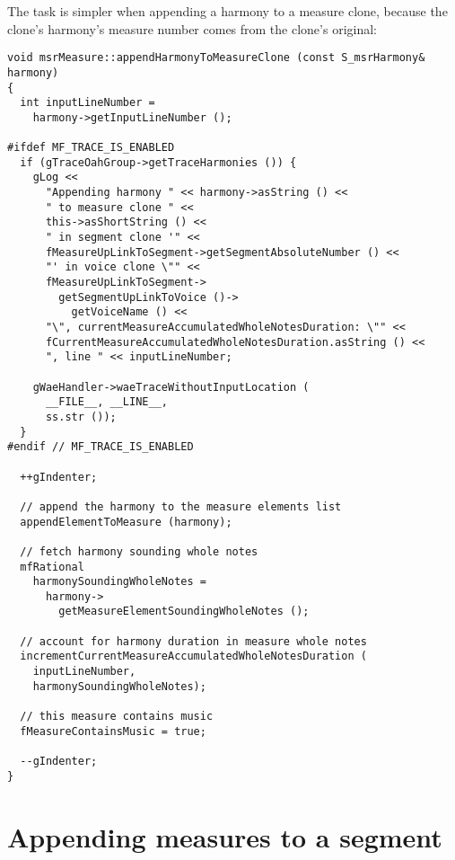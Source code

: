 The task is simpler when appending a harmony to a measure clone, because the clone's harmony's measure number comes from the clone's original:
\begin{lstlisting}[language=CPlusPlus]
void msrMeasure::appendHarmonyToMeasureClone (const S_msrHarmony& harmony)
{
  int inputLineNumber =
    harmony->getInputLineNumber ();

#ifdef MF_TRACE_IS_ENABLED
  if (gTraceOahGroup->getTraceHarmonies ()) {
    gLog <<
      "Appending harmony " << harmony->asString () <<
      " to measure clone " <<
      this->asShortString () <<
      " in segment clone '" <<
      fMeasureUpLinkToSegment->getSegmentAbsoluteNumber () <<
      "' in voice clone \"" <<
      fMeasureUpLinkToSegment->
        getSegmentUpLinkToVoice ()->
          getVoiceName () <<
      "\", currentMeasureAccumulatedWholeNotesDuration: \"" <<
      fCurrentMeasureAccumulatedWholeNotesDuration.asString () <<
      ", line " << inputLineNumber;

    gWaeHandler->waeTraceWithoutInputLocation (
      __FILE__, __LINE__,
      ss.str ());
  }
#endif // MF_TRACE_IS_ENABLED

  ++gIndenter;

  // append the harmony to the measure elements list
  appendElementToMeasure (harmony);

  // fetch harmony sounding whole notes
  mfRational
    harmonySoundingWholeNotes =
      harmony->
        getMeasureElementSoundingWholeNotes ();

  // account for harmony duration in measure whole notes
  incrementCurrentMeasureAccumulatedWholeNotesDuration (
    inputLineNumber,
    harmonySoundingWholeNotes);

  // this measure contains music
  fMeasureContainsMusic = true;

  --gIndenter;
}
\end{lstlisting}


\section{Appending measures to a segment}

